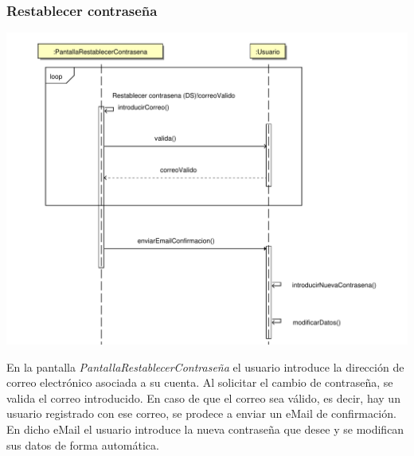 \documentclass[11pt, a4paper, twoside, titlepage]{article}
\begin{document}
			\subsubsection{Restablecer contraseña}
				\begin{center}
					\hspace*{.5cm} \includegraphics[scale=.75]{diseno/diagramas/restablecercontrasena.pdf}
				\end{center}

				En la pantalla {\itshape PantallaRestablecerContraseña} el usuario introduce la dirección de correo electrónico asociada a su cuenta. Al solicitar el cambio de contraseña, se valida el correo introducido. En caso de que el correo sea válido, es decir, hay un usuario registrado con ese correo, se prodece a enviar un eMail de confirmación. En dicho eMail el usuario introduce la nueva contraseña que desee y se modifican sus datos de forma automática.
\end{document}
